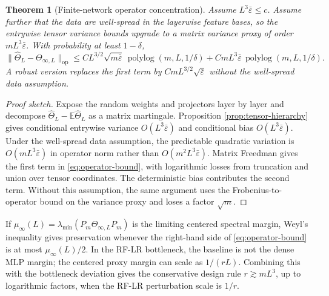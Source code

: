 \documentclass{article}
\newtheorem{theorem}{Theorem}[section]
\newcommand{\E}{\mathbb E}
\newcommand{\op}{\mathrm{op}}
\newcommand{\wh}{\widehat}
\newcommand{\barE}{\bar\varepsilon}
\begin{document}
\begin{theorem}[Finite-network operator concentration]
\label{thm:operator}
Assume \(L^3\barE\le c\). Assume further that the data are well-spread in the layerwise feature bases, so the entrywise tensor variance bounds upgrade to a matrix variance proxy of order \(mL^3\barE\). With probability at least \(1-\delta\),
\begin{equation}
\|\wh\Theta_L-\Theta_{\infty,L}\|_{\op}
\le
C L^{3/2}\sqrt{m\barE}\,\operatorname{polylog}(m,L,1/\delta)
+C mL^3\barE\,\operatorname{polylog}(m,L,1/\delta).
\label{eq:operator-bound}
\end{equation}
A robust version replaces the first term by \(C mL^{3/2}\sqrt{\barE}\) without the well-spread data assumption.
\end{theorem}

\begin{proof}[Proof sketch]
Expose the random weights and projectors layer by layer and decompose \(\wh\Theta_L-\E\wh\Theta_L\) as a matrix martingale. Proposition \ref{prop:tensor-hierarchy} gives conditional entrywise variance \(O(L^3\barE)\) and conditional bias \(O(L^3\barE)\). Under the well-spread data assumption, the predictable quadratic variation is \(O(mL^3\barE)\) in operator norm rather than \(O(m^2L^3\barE)\). Matrix Freedman gives the first term in \eqref{eq:operator-bound}, with logarithmic losses from truncation and union over tensor coordinates. The deterministic bias contributes the second term. Without this assumption, the same argument uses the Frobenius-to-operator bound on the variance proxy and loses a factor \(\sqrt m\).
\end{proof}

If \(\mu_\infty(L)=\lambda_{\min}(P_m\Theta_{\infty,L}P_m)\) is the limiting centered spectral margin, Weyl's inequality gives preservation whenever the right-hand side of \eqref{eq:operator-bound} is at most \(\mu_\infty(L)/2\). In the RF-LR bottleneck, the baseline is not the dense MLP margin; the centered proxy margin can scale as \(1/(rL)\). Combining this with the bottleneck deviation gives the conservative design rule \(r\gtrsim mL^3\), up to logarithmic factors, when the RF-LR perturbation scale is \(1/r\).
\end{document}
